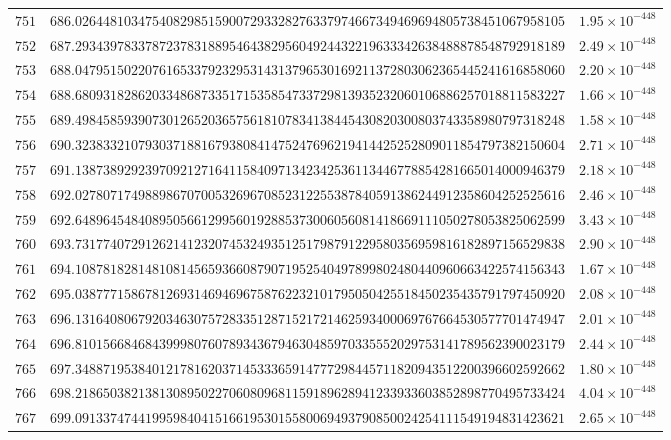 \documentclass[12pt,reqno]{amsart}
\theoremstyle{remark}
\begin{document}
\begin{longtable}{clc}
$751$ & $686.0264481034754082985159007293328276337974667349469694805738451067958105$ & $1.95\times 10^{-448}$ \\
$752$ & $687.2934397833787237831889546438295604924432219633342638488878548792918189$ & $2.49\times 10^{-448}$ \\
$753$ & $688.0479515022076165337923295314313796530169211372803062365445241616858060$ & $2.20\times 10^{-448}$ \\
$754$ & $688.6809318286203348687335171535854733729813935232060106886257018811583227$ & $1.66\times 10^{-448}$ \\
$755$ & $689.4984585939073012652036575618107834138445430820300803743358980797318248$ & $1.58\times 10^{-448}$ \\
$756$ & $690.3238332107930371881679380841475247696219414425252809011854797382150604$ & $2.71\times 10^{-448}$ \\
$757$ & $691.1387389292397092127164115840971342342536113446778854281665014000946379$ & $2.18\times 10^{-448}$ \\
$758$ & $692.0278071749889867070053269670852312255387840591386244912358604252525616$ & $2.46\times 10^{-448}$ \\
$759$ & $692.6489645484089505661299560192885373006056081418669111050278053825062599$ & $3.43\times 10^{-448}$ \\
$760$ & $693.7317740729126214123207453249351251798791229580356959816182897156529838$ & $2.90\times 10^{-448}$ \\
$761$ & $694.1087818281481081456593660879071952540497899802480440960663422574156343$ & $1.67\times 10^{-448}$ \\
$762$ & $695.0387771586781269314694696758762232101795050425518450235435791797450920$ & $2.08\times 10^{-448}$ \\
$763$ & $696.1316408067920346307572833512871521721462593400069767664530577701474947$ & $2.01\times 10^{-448}$ \\
$764$ & $696.8101566846843999807607893436794630485970335552029753141789562390023179$ & $2.44\times 10^{-448}$ \\
$765$ & $697.3488719538401217816203714533365914777298445711820943512200396602592662$ & $1.80\times 10^{-448}$ \\
$766$ & $698.2186503821381308950227060809681159189628941233933603852898770495733424$ & $4.04\times 10^{-448}$ \\
$767$ & $699.0913374744199598404151661953015580069493790850024254111549194831423621$ & $2.65\times 10^{-448}$ \\

\end{longtable}
\end{document}
